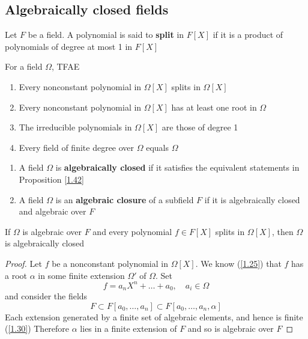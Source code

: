 \documentclass[11pt]{article}
\begin{document}
\subsection{Algebraically closed fields}
\label{sec:org7c7cb81}
Let \(F\) be a field. A polynomial is said to \textbf{split} in \(F[X]\) if it is a product of
polynomials of degree at most 1 in \(F[X]\)

\begin{proposition}[]
\label{1.42}
For a field \(\Omega\), TFAE
\begin{enumerate}
\item Every nonconstant polynomial in \(\Omega[X]\) splits in \(\Omega[X]\)
\item Every nonconstant polynomial in \(\Omega[X]\) has at least one root in \(\Omega\)
\item The irreducible polynomials in \(\Omega[X]\) are those of degree 1
\item Every field of finite degree over \(\Omega\) equals \(\Omega\)
\end{enumerate}
\end{proposition}

\begin{definition}[]
\begin{enumerate}
\item A field \(\Omega\) is \textbf{algebraically closed} if it satisfies the equivalent statements in Proposition \ref{1.42}
\item A field \(\Omega\) is an \textbf{algebraic closure} of a subfield \(F\) if it is algebraically closed and
algebraic over \(F\)
\end{enumerate}
\end{definition}

\begin{proposition}[]
If \(\Omega\) is algebraic over \(F\) and every polynomial \(f\in F[X]\) splits in \(\Omega[X]\), then \(\Omega\) is
algebraically closed
\end{proposition}

\begin{proof}
Let \(f\) be a nonconstant polynomial in \(\Omega[X]\). We know (\ref{1.25}) that \(f\) has a root
\(\alpha\) in some finite extension \(\Omega'\) of \(\Omega\). Set
\begin{equation*}
f=a_nX^n+\dots+a_0,\quad a_i\in\Omega
\end{equation*}
and consider the fields
\begin{equation*}
F\subset F[a_0,\dots,a_n]\subset F[a_0,\dots,a_n,\alpha]
\end{equation*}
Each extension generated by a finite set of algebraic elements, and hence is finite (\ref{1.30})
Therefore \(\alpha\) lies in a finite extension of \(F\) and so is algebraic over \(F\)
\end{proof}
\end{document}
